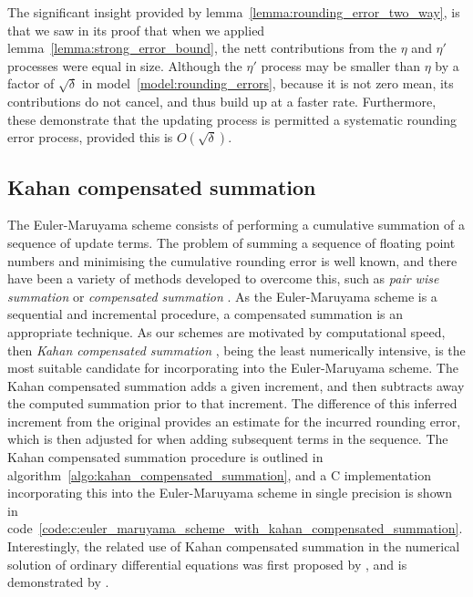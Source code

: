 \documentclass[manuscript,review]{acmart}
\begin{document}
The significant insight provided by lemma~\ref{lemma:rounding_error_two_way}, is that we saw in its proof that when we applied lemma~\ref{lemma:strong_error_bound}, the nett contributions from the $ \eta $ and $ \eta' $ processes were equal in size. Although the $ \eta' $ process may be smaller than $ \eta $ by a factor of $ \sqrt{\delta} $ in model~\ref{model:rounding_errors}, because it is not zero mean, its contributions do not cancel, and thus build up at a faster rate. Furthermore, these demonstrate that the updating process is permitted a systematic rounding error process, provided this is $ O(\sqrt{\delta}) $.

\subsection{Kahan compensated summation}
\label{sec:kahan_compensated_summation}

The Euler-Maruyama scheme consists of performing a cumulative summation of a sequence of update terms. The problem of summing a sequence of floating point numbers and minimising the cumulative rounding error is well known, and there have been a variety of methods developed to overcome this, such as \emph{pair wise summation} or \emph{compensated summation} \citep[4.1]{higham2002accuracy}. As the Euler-Maruyama scheme is a sequential and incremental procedure, a compensated summation is an appropriate technique. As our schemes are motivated by computational speed, then \emph{Kahan compensated summation} \citep{kahan1965further}, being the least numerically intensive, is the most suitable candidate for incorporating into the Euler-Maruyama scheme. The Kahan compensated summation adds a given increment, and then subtracts away the computed summation prior to that increment. The difference of this inferred increment from the original provides an estimate for the incurred rounding error, which is then adjusted for when adding subsequent terms in the sequence. The Kahan compensated summation procedure is outlined in algorithm~\ref{algo:kahan_compensated_summation}, and a C implementation incorporating this into the Euler-Maruyama scheme in single precision is shown in code~\ref{code:c:euler_maruyama_scheme_with_kahan_compensated_summation}. Interestingly, the related use of Kahan compensated summation in the numerical solution of ordinary differential equations was first proposed by \citet{vitasek1969numerical}, and is demonstrated by \citet[pages~86--87]{higham1993accuracy}.
\end{document}
